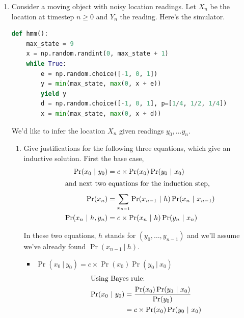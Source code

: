 \documentclass[10pt,\jkfside,a4paper]{article}
\begin{document}
\begin{enumerate}
We now have an unbiased estimator for $\mu$ and can use fmin to find a
solution for $\mu$ and $\sigma$ for example by using the following code:
\begin{lstlisting}[language=Python, mathescape=true]
$\alpha$ = $\text{Var}(X_n)$
$\beta$ = $\text{Var}(X_{n+1} - X_n)$
def error(x):
	$\lambda$, $\sigma$ = x
	dif_$\alpha$ = $\alpha$ - $\frac{\sigma^2}{1 - \lambda^2}$
	dif_$\beta$ = $\beta$ - $\frac{(2 - \lambda)\sigma^2}{1 + \lambda}$
	return dif_$\alpha$ ** 2 + dif_$\beta$ ** 2
opt.fmin(error, [$\lambda_0$, $\sigma_0$])
\end{lstlisting}

\item Consider a moving object with noisy location readings. Let $X_n$ be
the location at timestep $n \geq 0$ and $Y_n$ the reading. Here's the
simulator.

\begin{lstlisting}[language=Python]
def hmm():
	max_state = 9
	x = np.random.randint(0, max_state + 1)
	while True:
		e = np.random.choice([-1, 0, 1])
		y = min(max_state, max(0, x + e))
		yield y
		d = np.random.choice([-1, 0, 1], p=[1/4, 1/2, 1/4])
		x = min(max_state, max(0, x + d))
\end{lstlisting}

We'd like to infer the location $X_n$ given readings $y_0, \dots y_n$.

\begin{enumerate}[label=(\alph*)]

\item Give justifications for the following three equations, which give an
inductive solution. First the base case,
\begin{align*}
\Pr(x_0 \ | \ y_0) &= c \times \Pr(x_0) \Pr(y_0 \ | \ x_0) \\
\intertext{and next two equations for the induction step,}
\Pr(x_n) &= \sum^{}_{x_{n-1}} \Pr(x_{n-1} \ | \ h) \Pr(x_n \ | \ x_{n-1}) \\
\Pr(x_n \ | \ h, y_n) &= c \times \Pr(x_n \ | \ h)\Pr(y_n \ | \ x_n)
\end{align*}

In these two equations, $h$ stands for $(y_0, \dots, y_{n-1})$ and we'll
assume we've already found $\Pr(x_{n-1} \ | \ h)$.

\begin{itemize}

\item $\Pr(x_0 \ | \ y_0) = c \times \Pr(x_0)\Pr(y_0 \ | \ x_0) $
\begin{align*}
\intertext{Using Bayes rule:}
\Pr(x_0 \ | \ y_0)
&= \frac{\Pr(x_0)\Pr(y_0 \ | \ x_0)}{\Pr(y_0)} \\
&= c \times \Pr(x_0) \Pr(y_0 \ | \ x_0) \\
\end{align*}


\end{itemize}
\end{enumerate}
\end{enumerate}
\end{document}
